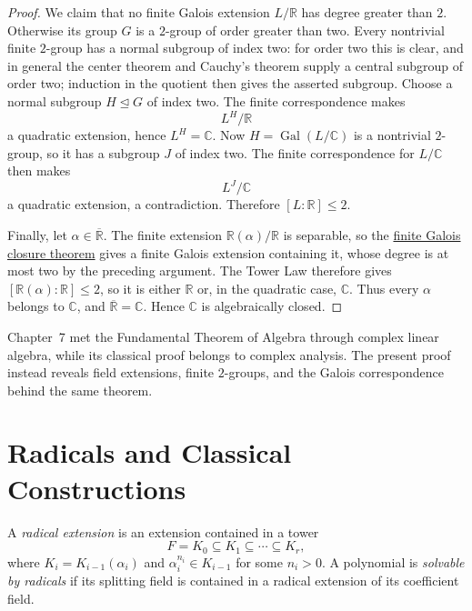 \begin{proof}
We claim that no finite Galois extension \(L/\mathbb R\) has degree greater
than \(2\).  Otherwise its group \(G\) is a \(2\)-group of order greater than
two.  Every nontrivial finite \(2\)-group has a normal subgroup of index two:
for order two this is clear, and in general the center theorem and Cauchy's
theorem supply a central subgroup of order two; induction in the quotient
then gives the asserted subgroup.  Choose a normal subgroup \(H\trianglelefteq
G\) of index two.  The finite correspondence makes
\[
L^H/\mathbb R
\]
a quadratic extension, hence \(L^H=\mathbb C\).  Now \(H=
\operatorname{Gal}(L/\mathbb C)\) is a nontrivial \(2\)-group, so it has a
subgroup \(J\) of index two.  The finite correspondence for \(L/\mathbb C\)
then makes
\[
L^J/\mathbb C
\]
a quadratic extension, a contradiction.  Therefore \([L:\mathbb R]\leq2\).

Finally, let \(\alpha\in\overline{\mathbb R}\).  The finite extension
\(\mathbb R(\alpha)/\mathbb R\) is separable, so the
\hyperref[thm:finite-galois-closure]{finite Galois closure theorem} gives a
finite Galois extension containing it, whose degree is at most two by the
preceding argument.  The Tower Law therefore
gives \([\mathbb R(\alpha):\mathbb R]\leq2\), so it is either \(\mathbb R\)
or, in the quadratic case, \(\mathbb C\).  Thus every \(\alpha\) belongs to \(\mathbb C\), and
\(\overline{\mathbb R}=\mathbb C\).  Hence \(\mathbb C\) is algebraically
closed.
\end{proof}

\begin{unremark}
Chapter~7 met the Fundamental Theorem of Algebra through complex linear
algebra, while its classical proof belongs to complex analysis.  The present
proof instead reveals field extensions, finite \(2\)-groups, and the Galois
correspondence behind the same theorem.
\end{unremark}

\section{Radicals and Classical Constructions}

\begin{definition}
A \emph{radical extension} is an extension contained in a tower
\[
F=K_0\subseteq K_1\subseteq\cdots\subseteq K_r,
\]
where \(K_i=K_{i-1}(\alpha_i)\) and
\(\alpha_i^{n_i}\in K_{i-1}\) for some \(n_i>0\).  A polynomial is
\emph{solvable by radicals} if its splitting field is contained in a radical
extension of its coefficient field.
\end{definition}

